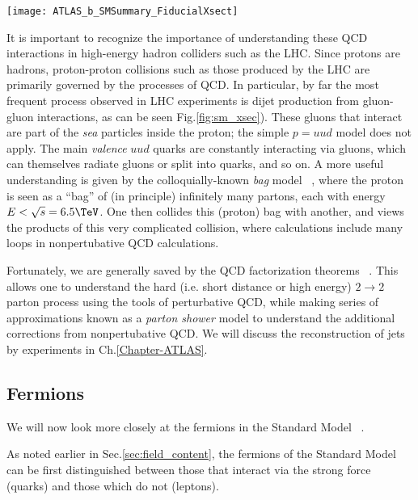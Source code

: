 \begin{sidewaysfigure}[htbp]
\caption{Cross-sections of various Standard Model processes}
\label{fig:sm_xsec}
\texttt{[image: ATLAS\_b\_SMSummary\_FiducialXsect]}
\end{sidewaysfigure}

It is important to recognize the importance of understanding these QCD interactions in high-energy hadron colliders such as the LHC.
Since protons are hadrons, proton-proton collisions such as those produced by the LHC are primarily governed by the processes of QCD.
In particular, by far the most frequent process observed in LHC experiments is dijet production from gluon-gluon interactions, as can be seen Fig.\ref{fig:sm_xsec}).
These gluons that interact are part of the \textit{sea} particles inside the proton; the simple $p = uud$ model does not apply.
The main \textit{valence} $uud$ quarks are constantly interacting via gluons, which can themselves radiate gluons or split into quarks, and so on.
A more useful understanding is given by the colloquially-known \textit{bag} model ~\cite{Chodos:1974je, Chodos:1974pn}, where the proton is seen as a ``bag'' of (in principle) infinitely many partons, each with energy $ E < \sqrt{s} = 6.5 \TeV$.
One then collides this (proton) bag with another, and views the products of this very complicated collision, where calculations include many loops in nonpertubative QCD calculations.

Fortunately, we are generally saved by the QCD factorization theorems ~\cite{Collins:1989gx}.
This allows one to understand the hard (i.e. short distance or high energy) $2 \rightarrow 2$ parton process using the tools of perturbative QCD, while making series of approximations known as a \textit{parton shower} model to understand the additional corrections from nonpertubative QCD.
We will discuss the reconstruction of jets by experiments in Ch.\ref{Chapter-ATLAS}.

\subsection{Fermions}

We will now look more closely at the fermions in the Standard Model ~\cite{Agashe:2014kda}.

As noted earlier in Sec.\ref{sec:field_content}, the fermions of the Standard Model can be first distinguished between those that interact via the strong force (quarks) and those which do not (leptons).

